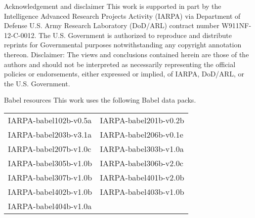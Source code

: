 \documentclass[12pt,xcolor=dvipsnames]{beamer}
\begin{document}

\begin{frame}{Acknowledgement and disclaimer}{}
  This work is supported in part by the Intelligence Advanced Research
  Projects Activity (IARPA) via Department of Defense U.S. Army
  Research Laboratory (DoD/ARL) contract number W911NF-12-C-0012. The
  U.S. Government is authorized to reproduce and distribute reprints
  for Governmental purposes notwithstanding any copyright annotation
  thereon.
  \vfill
  Disclaimer: The views and conclusions contained herein are
  those of the authors and should not be interpreted as necessarily
  representing the official policies or endorsements, either expressed
  or implied, of IARPA, DoD/ARL, or the U.S. Government.
\end{frame}

\begin{frame}{Babel resources}{}
  This work uses the following Babel data packs.
  \vfill
  \centering
  \begin{tabular}{@{}ll@{}}
    IARPA-babel102b-v0.5a & IARPA-babel201b-v0.2b \\
    IARPA-babel203b-v3.1a & IARPA-babel206b-v0.1e \\
    IARPA-babel207b-v1.0c & IARPA-babel303b-v1.0a \\
    IARPA-babel305b-v1.0b & IARPA-babel306b-v2.0c \\
    IARPA-babel307b-v1.0b & IARPA-babel401b-v2.0b \\
    IARPA-babel402b-v1.0b & IARPA-babel403b-v1.0b \\
    IARPA-babel404b-v1.0a & \\
  \end{tabular}
\end{frame}


\end{document}
